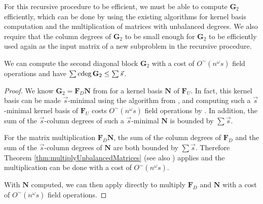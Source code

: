 For this recursive procedure to be efficient, we must be able to compute
$\mathbf{G}_{2}$ efficiently, which can be done by using the existing
algorithms for kernel basis computation and the multiplication of
matrices with unbalanced degrees. We also require that the column
degrees of $\mathbf{G}_{2}$ to be small enough for $\mathbf{G}_{2}$
to be efficiently used again as the input matrix of a new subproblem
in the recursive procedure.
\begin{lem}
\label{lem:secondDiagonalBlock}We can compute the second diagonal
block $\mathbf{G}_{2}$ with a cost of $O^{\sim}\left(n^{\omega}s\right)$
field operations and have $\sum{\rm cdeg}\,\mathbf{G}_{2}\le\sum\vec{s}$.\end{lem}
\begin{proof}
We know $\mathbf{G}_{2}=\mathbf{F}_{D}\mathbf{N}$ from 
for a kernel basis $\mathbf{N}$ of $\mathbf{F}_{U}$. In fact, this
kernel basis can be made $\vec{s}$-minimal using the algorithm from
\citet{za2012}, and computing such a $\vec{s}$-minimal kernel basis
of $\mathbf{F}_{U}$ costs $O^{\sim}\left(n^{\omega}s\right)$ field
operations by . In addition, the sum of
the $\vec{s}$-column degrees of such a $\vec{s}$-minimal $\mathbf{N}$
is bounded by $\sum\vec{s}$.

For the matrix multiplication $\mathbf{F}_{D}\mathbf{N}$, the sum
of the column degrees of $\mathbf{F}_{D}$ and the sum of the $\vec{s}$-column
degrees of $\mathbf{N}$ are both bounded by $\sum\vec{s}$. Therefore
Theorem \ref{thm:multiplyUnbalancedMatrices} (see also \citet[Theorem 3.7]{za2012})
applies and the multiplication can be done with a cost of $O^{\sim}\left(n^{\omega}s\right)$.

With $\mathbf{N}$ computed, we can then apply 
directly to multiply $\mathbf{F}_{D}$ and $\mathbf{N}$ with a cost
of $O^{\sim}\left(n^{\omega}s\right)$ field operations. 
\end{proof}

